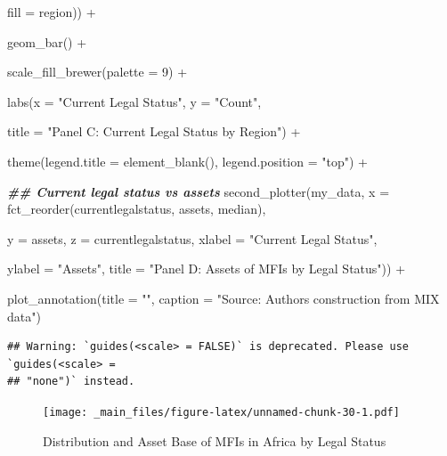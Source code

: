 \documentclass[a4paper,nobind]{templates/ociamthesis}
\newenvironment{Shaded}{\begin{snugshade}}{\end{snugshade}}
\newcommand{\AttributeTok}[1]{\textcolor[rgb]{0.77,0.63,0.00}{#1}}
\newcommand{\DecValTok}[1]{\textcolor[rgb]{0.00,0.00,0.81}{#1}}
\newcommand{\DocumentationTok}[1]{\textcolor[rgb]{0.56,0.35,0.01}{\textbf{\textit{#1}}}}
\newcommand{\FunctionTok}[1]{\textcolor[rgb]{0.00,0.00,0.00}{#1}}
\newcommand{\NormalTok}[1]{#1}
\newcommand{\SpecialCharTok}[1]{\textcolor[rgb]{0.00,0.00,0.00}{#1}}
\newcommand{\StringTok}[1]{\textcolor[rgb]{0.31,0.60,0.02}{#1}}
\renewenvironment{Shaded}
{
  \vspace{10pt}%
  \begin{snugshade}%
}{%
  \end{snugshade}%
  \vspace{8pt}%
}
\begin{document}
\begin{landscape}
\begin{Shaded}
\begin{Highlighting}[]
                     \AttributeTok{fill =}\NormalTok{ region)) }\SpecialCharTok{+} 
  
  \FunctionTok{geom\_bar}\NormalTok{() }\SpecialCharTok{+} 
  
  \FunctionTok{scale\_fill\_brewer}\NormalTok{(}\AttributeTok{palette =} \DecValTok{9}\NormalTok{) }\SpecialCharTok{+} 
  
  \FunctionTok{labs}\NormalTok{(}\AttributeTok{x =} \StringTok{"Current Legal Status"}\NormalTok{, }\AttributeTok{y =} \StringTok{"Count"}\NormalTok{, }
       
       \AttributeTok{title =} \StringTok{"Panel C: Current Legal Status by Region"}\NormalTok{) }\SpecialCharTok{+} 
  
  \FunctionTok{theme}\NormalTok{(}\AttributeTok{legend.title =} \FunctionTok{element\_blank}\NormalTok{(), }\AttributeTok{legend.position =} \StringTok{"top"}\NormalTok{) }\SpecialCharTok{+} 


\DocumentationTok{\#\# Current legal status vs assets}
\FunctionTok{second\_plotter}\NormalTok{(my\_data, }\AttributeTok{x =} \FunctionTok{fct\_reorder}\NormalTok{(currentlegalstatus, assets, median), }
           
          \AttributeTok{y =}\NormalTok{ assets, }\AttributeTok{z =}\NormalTok{ currentlegalstatus, }\AttributeTok{xlabel =} \StringTok{"Current Legal Status"}\NormalTok{, }
          
          \AttributeTok{ylabel =} \StringTok{"Assets"}\NormalTok{, }\AttributeTok{title =} \StringTok{"Panel D: Assets of MFIs by Legal Status"}\NormalTok{))  }\SpecialCharTok{+} 
  
  \FunctionTok{plot\_annotation}\NormalTok{(}\AttributeTok{title =} \StringTok{""}\NormalTok{, }\AttributeTok{caption =} \StringTok{"Source: Authors\textquotesingle{} construction from MIX data"}\NormalTok{)}
\end{Highlighting}
\end{Shaded}

\begin{verbatim}
## Warning: `guides(<scale> = FALSE)` is deprecated. Please use `guides(<scale> =
## "none")` instead.
\end{verbatim}

\begin{figure}
\centering
\texttt{[image: \_main\_files/figure-latex/unnamed-chunk-30-1.pdf]}
\caption{\label{fig:unnamed-chunk-30}Distribution and Asset Base of MFIs in Africa by Legal Status}
\end{figure}


\end{landscape}
\end{document}

